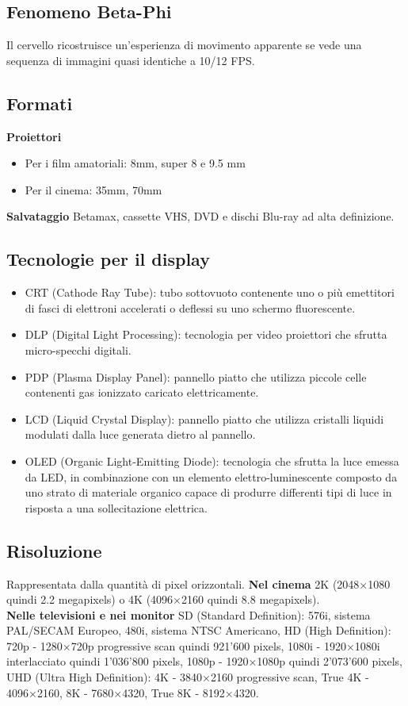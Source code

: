 \documentclass[8pt,a4paper]{article}
\begin{document}
\begin{multicols}{5}
    \subsection{Fenomeno Beta-Phi}
    Il cervello ricostruisce un'esperienza di movimento apparente se vede una 
    sequenza di immagini quasi identiche a 10/12 FPS.
    \subsection{Formati}
      \textbf{Proiettori}
      \begin{itemize}
        \item Per i film amatoriali: 8mm, super 8 e 9.5 mm
        \item Per il cinema: 35mm, 70mm
      \end{itemize}
      \textbf{Salvataggio}
      Betamax, cassette VHS, DVD e dischi Blu-ray ad alta definizione.
    \subsection{Tecnologie per il display}
    \begin{itemize}
      \item CRT (Cathode Ray Tube): tubo sottovuoto contenente uno o più emettitori 
      di fasci di elettroni accelerati o deflessi su uno schermo fluorescente.
      \item DLP (Digital Light Processing): tecnologia per video proiettori che 
      sfrutta micro-specchi digitali.
      \item PDP (Plasma Display Panel): pannello piatto che utilizza piccole celle 
      contenenti gas ionizzato caricato elettricamente.
      \item LCD (Liquid Crystal Display): pannello piatto che utilizza cristalli liquidi 
      modulati dalla luce generata dietro al pannello. 
      \item OLED (Organic Light-Emitting Diode): tecnologia che sfrutta la luce emessa 
      da LED, in combinazione con un elemento elettro-luminescente composto da uno 
      strato di materiale organico capace di produrre differenti tipi di luce in 
      risposta a una sollecitazione elettrica.
    \end{itemize}
    \subsection{Risoluzione}
    Rappresentata dalla quantità di pixel orizzontali. 
      \textbf{Nel cinema} 2K (2048×1080 quindi 2.2 megapixels) o 4K (4096×2160 quindi 
      8.8 megapixels). \\
      \textbf{Nelle televisioni e nei monitor} SD (Standard Definition): 576i, sistema 
      PAL/SECAM Europeo, 480i, sistema NTSC Americano, HD (High Definition): 720p - 
      1280×720p progressive scan quindi 921’600 pixels, 1080i - 1920×1080i interlacciato 
      quindi 1’036’800 pixels, 1080p - 1920×1080p quindi 2’073’600 pixels, UHD (Ultra 
      High Definition): 4K - 3840×2160 progressive scan, True 4K - 4096×2160, 8K - 
      7680×4320, True 8K - 8192×4320.

\end{multicols}
\end{document}

